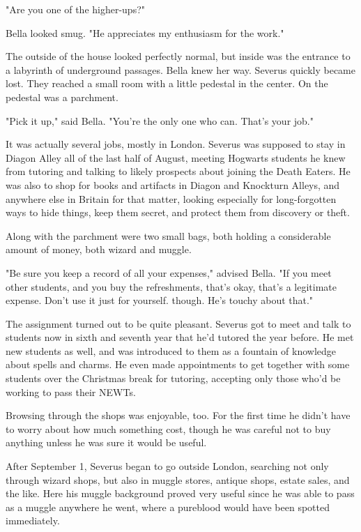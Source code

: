 \documentclass[a4paper,11pt]{article}
\begin{document}
"Are you one of the higher-ups?"

Bella looked smug. "He appreciates my enthusiasm for the work."

The outside of the house looked perfectly normal, but inside was the entrance to a labyrinth of underground passages. Bella knew her way. Severus quickly became lost. They reached a small room with a little pedestal in the center. On the pedestal was a parchment.

"Pick it up," said Bella. "You're the only one who can. That's your job."

It was actually several jobs, mostly in London. Severus was supposed to stay in Diagon Alley all of the last half of August, meeting Hogwarts students he knew from tutoring and talking to likely prospects about joining the Death Eaters. He was also to shop for books and artifacts in Diagon and Knockturn Alleys, and anywhere else in Britain for that matter, looking especially for long-forgotten ways to hide things, keep them secret, and protect them from discovery or theft.

Along with the parchment were two small bags, both holding a considerable amount of money, both wizard and muggle.

"Be sure you keep a record of all your expenses," advised Bella. "If you meet other students, and you buy the refreshments, that's okay, that's a legitimate expense. Don't use it just for yourself. though. He's touchy about that."

The assignment turned out to be quite pleasant. Severus got to meet and talk to students now in sixth and seventh year that he'd tutored the year before. He met new students as well, and was introduced to them as a fountain of knowledge about spells and charms. He even made appointments to get together with some students over the Christmas break for tutoring, accepting only those who'd be working to pass their NEWTs.

Browsing through the shops was enjoyable, too. For the first time he didn't have to worry about how much something cost, though he was careful not to buy anything unless he was sure it would be useful.

After September 1, Severus began to go outside London, searching not only through wizard shops, but also in muggle stores, antique shops, estate sales, and the like. Here his muggle background proved very useful since he was able to pass as a muggle anywhere he went, where a pureblood would have been spotted immediately.
\end{document}
